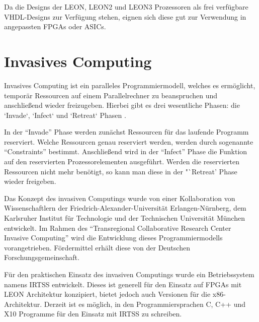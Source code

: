 Da die Designs der LEON, LEON2 und LEON3 Prozessoren als frei verfügbare VHDL-Designs\cite{leonWikiDe} zur Verfügung stehen, eignen 
sich diese gut zur Verwendung in angepassten FPGAs oder ASICs\cite{leonWikiDe}.

\section{Invasives Computing}

Invasives Computing ist ein paralleles Programmiermodell, welches es ermöglicht, temporär Ressourcen auf einem Parallelrechner
zu beanspruchen und anschließend wieder freizugeben. Hierbei gibt es drei wesentliche Phasen: die `Invade`, `Infect` und `Retreat` Phasen \cite{invasicWikiOverview}. 

In der "`Invade"' Phase werden zunächst Ressourcen für das laufende Programm reserviert. Welche Ressourcen genau reserviert werden,
werden durch sogenannte "`Constraints"' bestimmt\cite{invasicWikiOverview}.
Anschließend wird in der "`Infect"' Phase die Funktion auf den reservierten Prozessorelementen ausgeführt\cite{invasicWikiOverview}.
Werden die reservierten Ressourcen nicht mehr benötigt, so kann man diese in der "`Retreat' Phase wieder
freigeben\cite{invasicWikiOverview}.

Das Konzept des invasiven Computings wurde von einer Kollaboration von Wissenschaftlern der
Friedrich-Alexander-Universität Erlangen-Nürnberg, dem Karlsruher Institut für Technologie und der 
Technischen Universität München entwickelt\cite{invasicHome}.
Im Rahmen des "`Transregional Collaborative Research Center Invasive Computing"'\cite{invasicHome}
wird die Entwicklung dieses Programmiermodells vorangetrieben.
Fördermittel erhält diese von der Deutschen Forschungsgemeinschaft\cite{invasicHome}.

Für den praktischen Einsatz des invasiven Computings wurde ein Betriebssystem namens IRTSS entwickelt. Dieses ist generell für den
Einsatz auf FPGAs mit LEON Architektur konzipiert, bietet jedoch auch Versionen für die x86-Architektur. Derzeit ist es möglich,
in den Programmiersprachen C, C++ und X10 Programme für den Einsatz mit IRTSS zu schreiben.
